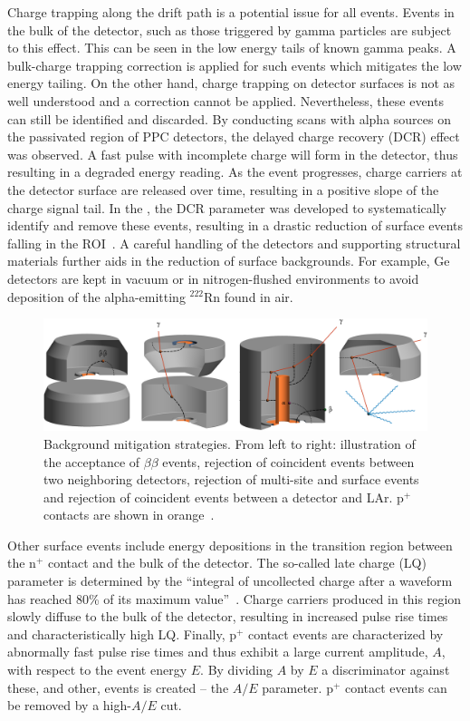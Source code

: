 Charge trapping along the drift path is a potential issue for all events. Events in the bulk of the detector, such as those triggered by gamma particles are subject to this effect. This can be seen in the low energy tails of known gamma peaks. A bulk-charge trapping correction is applied for such events which mitigates the low energy tailing. On the other hand, charge trapping on detector surfaces is not as well understood and a correction cannot be applied. Nevertheless, these events can still be identified and discarded. By conducting scans with alpha sources on the passivated region of PPC detectors, the delayed charge recovery (DCR) effect was observed. A fast pulse with incomplete charge will form in the detector, thus resulting in a degraded energy reading. As the event progresses, charge carriers at the detector surface are released over time, resulting in a positive slope of the charge signal tail. In the {\DEMit}, the DCR parameter was developed to systematically identify and remove these events, resulting in a drastic reduction of surface events falling in the \novbb{} ROI~\cite{dcr}. A careful handling of the detectors and supporting structural materials further aids in the reduction of surface backgrounds. For example, Ge detectors are kept in vacuum or in nitrogen-flushed environments to avoid deposition of the alpha-emitting $^{222}$Rn found in air.
\begin{figure}[htb]
	\centering
	\includegraphics[width = \linewidth]{figs/0vbb/bkg_events.png}
	\caption{Background mitigation strategies. From left to right: illustration of the acceptance of $\beta\beta$ events, rejection of coincident events between two neighboring detectors, rejection of multi-site and surface events and rejection of coincident events between a detector and LAr. p$^+$ contacts are shown in orange~\cite{legend_website_detectors}.} 
	\label{fig:bkg_disc}
\end{figure}

Other surface events include energy depositions in the transition region between the n$^+$ contact and the bulk of the detector. The so-called late charge (LQ) parameter is determined by the ``integral of uncollected charge after a waveform has reached 80\% of its maximum value''~\cite{mjd_final}. Charge carriers produced in this region slowly diffuse to the bulk of the detector, resulting in increased pulse rise times and characteristically high LQ. Finally, p$^+$ contact events are characterized by abnormally fast pulse rise times and thus exhibit a large current amplitude, $A$, with respect to the event energy $E$. By dividing $A$ by $E$ a discriminator against these, and other, events is created -- the $A/E$ parameter. p$^+$ contact events can be removed by a high-$A/E$ cut. 

